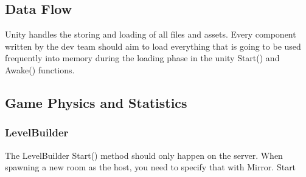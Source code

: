 \documentclass[11pt]{article}
\begin{document}
\subsection{Data Flow}
Unity handles the storing and loading of all files and assets. Every component written by the dev team should aim to load everything that is going to be used frequently into memory during the loading phase in the unity Start() and Awake() functions.

\subsection{Game Physics and Statistics}
\subsubsection{LevelBuilder}
The LevelBuilder Start() method should only happen on the server. When spawning a new room as the host, you need to specify that with Mirror.
\newline 
\newline Start
\end{document}
